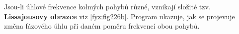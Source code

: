       Jsou-li úhlové frekvence kolmých pohybů různé, vznikají složité tzv. \textbf{Lissajousovy 
      obrazce} viz \ref{fyz:fig226b}. Program ukazuje, jak se projevuje změna fázového 
      úhlu při daném poměru frekvencí obou pohybů.

        
        \begin{lstlisting}[caption=\texttt{Lissajous.m} vykreslí skládání harmonických pohybů v 
          kolmých směrech.]
        \end{lstlisting}

\printbibliography[title={Seznam literatury},heading=subbibliography]
